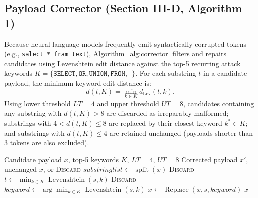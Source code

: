 \documentclass[conference]{IEEEtran}
\begin{document}
\subsection{Payload Corrector (Section III-D, Algorithm 1)}
Because neural language models frequently emit syntactically corrupted tokens (e.g., \texttt{salect * fram text}), Algorithm~\ref{alg:corrector} filters and repairs candidates using Levenshtein edit distance against the top-5 recurring attack keywords $K = \{\texttt{SELECT}, \texttt{OR}, \texttt{UNION}, \texttt{FROM}, \texttt{--}\}$. For each substring $t$ in a candidate payload, the minimum keyword edit distance is:
\begin{equation}
d(t,K)=\min_{k\in K}d_{\mathrm{Lev}}(t,k).
\end{equation}
Using lower threshold $LT=4$ and upper threshold $UT=8$, candidates containing any substring with $d(t,K) > 8$ are discarded as irreparably malformed; substrings with $4 < d(t,K) \le 8$ are replaced by their closest keyword $k^* \in K$; and substrings with $d(t,K) \le 4$ are retained unchanged (payloads shorter than 3 tokens are also excluded).

\begin{algorithm}[t]
\caption{Payload Corrector (Section III-D, Algorithm 1 \cite{wu2025})}
\label{alg:corrector}
\begin{algorithmic}[1]
\Require Candidate payload $x$, top-5 keywords $K$, $LT=4$, $UT=8$
\Ensure Corrected payload $x'$, unchanged $x$, or \textsc{Discard}
\State $\mathit{substringlist} \gets \operatorname{split}(x)$
    \State \Return \textsc{Discard}
\EndIf
{}
    \State $t \gets \min_{k \in K} \operatorname{Levenshtein}(s, k)$
        \State \Return \textsc{Discard}
        \State $\mathit{keyword} \gets \arg\min_{k \in K} \operatorname{Levenshtein}(s, k)$
        \State $x \gets \operatorname{Replace}(x, s, \mathit{keyword})$
    \EndIf
\EndFor
\State \Return $x$
\end{algorithmic}
\end{algorithm}
\end{document}
